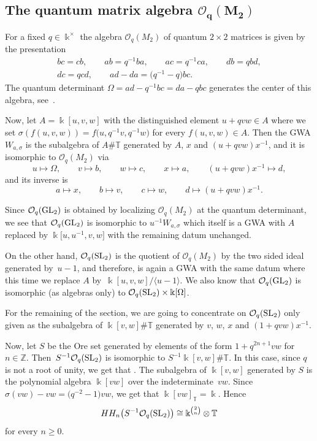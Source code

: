 \documentclass[10pt,a4paper]{amsart}
\newcommand{\C}[1]{\mathcal{#1}}
\newcommand{\B}[1]{\mathbb{#1}}
\newcommand{\CH}{{\rm CH}}
\renewcommand{\geq}{\geqslant}
\numberwithin{equation}{section}
\begin{document}
\subsection[The quantum matrix algebra CO\_q(M\_2)]{The quantum matrix algebra $\boldsymbol{\C{O}_q(M_2)}$}

For a fixed $q\in\Bbbk^\times$ the algebra $\C{O}_q(M_2)$ of quantum $2\times 2$ matrices
is given by the presentation
\begin{gather*}
 bc = cb,\qquad
 ab = q^{-1}ba,\qquad
 ac = q^{-1}ca,\qquad
 db = qbd,\\
 dc = qcd,\qquad
 ad-da = \bigl(q^{-1}-q\bigr)bc.
\end{gather*}
The quantum determinant
$\Omega = ad - q^{-1}bc = da - qbc$ generates the center of this algebra,
see~\cite[pp.~4--8]{BrownGoodearl:QuantumGroups}.

Now, let $A = \Bbbk[u,v,w]$ with the distinguished element $u + q vw\in A$ where we set
$\sigma(f(u,v,w))\allowbreak=f\bigl(u,q^{-1}v,q^{-1}w\bigr)$ for every $f(u,v,w)\in A$. Then the GWA
$W_{a,\sigma}$ is the subalgebra of $A\# \B{T}$ generated by $A$, $x$ and
$(u + qvw)x^{-1}$, and it is isomorphic to $\C{O}_q(M_2)$ via
\[ u\mapsto\Omega,\qquad
 v\mapsto b,\qquad
 w\mapsto c,\qquad
 x\mapsto a,\qquad
 (u+qvw) x^{-1}\mapsto d,
\]
and its inverse is
\[ a\mapsto x,\qquad
 b\mapsto v,\qquad
 c\mapsto w,\qquad
 d\mapsto (u+qvw)x^{-1}.
\]

Since $\C{O}_q({\rm GL}_2)$ is obtained by localizing $\C{O}_q(M_2)$ at the quantum determinant, we see
that $\C{O}_q({\rm GL}_2)$ is isomorphic to $u^{-1}W_{a,\sigma}$ which itself is a GWA with $A$ replaced
by $\Bbbk\big[u,u^{-1},v,w\big]$ with the remaining datum unchanged.

On the other hand, $\C{O}_q({\rm SL}_2)$ is the quotient of $\C{O}_q(M_2)$ by the two sided
ideal generated by~$u-1$, and therefore, is again a GWA with the same datum where this
time we replace $A$ by~$\Bbbk[u,v,w]/\langle u-1\rangle$. We also know that
$\C{O}_q({\rm GL}_2)$ is isomorphic (as algebras only) to $\C{O}_q({\rm SL}_2)\times \Bbbk[\Omega]$.

For the remaining of the section, we are going to concentrate on $\C{O}_q({\rm SL}_2)$ only given
as the subalgebra of $\Bbbk[v,w]\# \B{T}$ generated by $v$, $w$, $x$ and
$(1+qvw)x^{-1}$.

Now, let $S$ be the Ore set generated by elements of the form $1+q^{2n+1}vw$ for $n\in\B{Z}$. Then~$S^{-1}\C{O}_q({\rm SL}_2)$ is isomorphic to $S^{-1}\Bbbk[v,w]\# \B{T}$. In this case, since $q$ is not a
root of unity, we get that
\smash{$\CH_*\bigl(A,S^{-1}A\bigr)^{\B{T}}=\CH_*(\Bbbk) = \CH_*(A)_{\B{T}}$}. The subalgebra of $\Bbbk[v,w]$
generated by $S$ is the polynomial algebra $\Bbbk[vw]$ over the indeterminate~$vw$. Since
$\sigma(vw)-vw=\bigl(q^{-2}-1\bigr)vw$, we get that $\Bbbk[vw]_{\B{T}} = \Bbbk$. Hence
\[
 HH_n\bigl(S^{-1}\C{O}_q({\rm SL}_2)\bigr) \cong \Bbbk^{\binom{2}{n}}\otimes\B{T}
\] for every $n\geq 0$.
\end{document}
